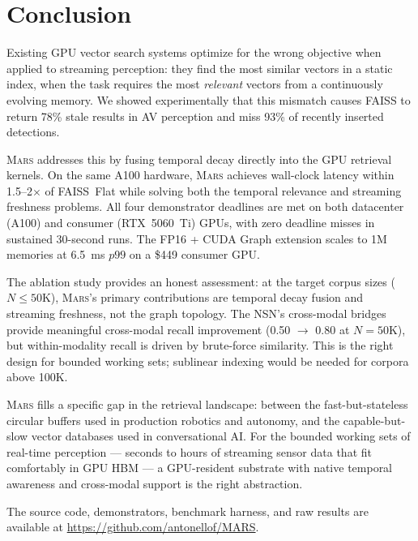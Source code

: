\documentclass[11pt]{article}
\newcommand{\mars}{\textsc{Mars}}
\begin{document}
\section{Conclusion}

Existing GPU vector search systems optimize for the wrong objective
when applied to streaming perception: they find the most similar
vectors in a static index, when the task requires the most
\emph{relevant} vectors from a continuously evolving memory. We showed
experimentally that this mismatch causes FAISS to return 78\% stale
results in AV perception and miss 93\% of recently inserted detections.

\mars{} addresses this by fusing temporal decay directly into the GPU
retrieval kernels. On the same A100 hardware, \mars{} achieves
wall-clock latency within 1.5--2$\times$ of FAISS~Flat while solving
both the temporal relevance and streaming freshness problems. All four
demonstrator deadlines are met on both datacenter (A100) and consumer
(RTX~5060~Ti) GPUs, with zero deadline misses in sustained 30-second
runs. The FP16 + CUDA Graph extension scales to 1M memories at
6.5~ms $p99$ on a \$449 consumer GPU.

The ablation study provides an honest assessment: at the target corpus
sizes ($N \leq 50$K), \mars{}'s primary contributions are temporal
decay fusion and streaming freshness, not the graph topology. The NSN's
cross-modal bridges provide meaningful cross-modal recall improvement
(0.50 $\to$ 0.80 at $N{=}50$K), but within-modality recall is driven
by brute-force similarity. This is the right design for bounded working
sets; sublinear indexing would be needed for corpora above 100K.

\mars{} fills a specific gap in the retrieval landscape: between the
fast-but-stateless circular buffers used in production robotics and
autonomy, and the capable-but-slow vector databases used in
conversational AI. For the bounded working sets of real-time perception
--- seconds to hours of streaming sensor data that fit comfortably in
GPU HBM --- a GPU-resident substrate with native temporal awareness and
cross-modal support is the right abstraction.

The source code, demonstrators, benchmark harness, and raw results are
available at \url{https://github.com/antonellof/MARS}.



\end{document}

